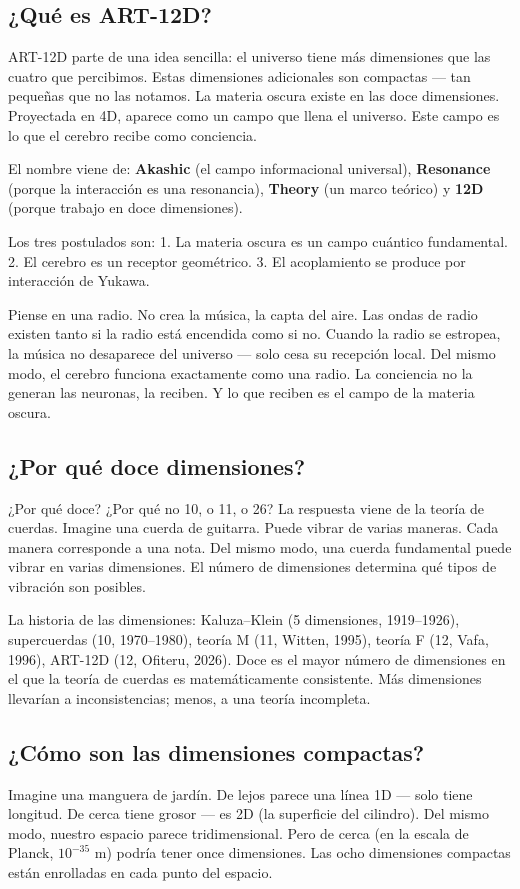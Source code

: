 \subsection{¿Qué es ART-12D?}
ART-12D parte de una idea sencilla: el universo tiene más dimensiones que las cuatro que percibimos. Estas dimensiones adicionales son compactas --- tan pequeñas que no las notamos. La materia oscura existe en las doce dimensiones. Proyectada en 4D, aparece como un campo que llena el universo. Este campo es lo que el cerebro recibe como conciencia.

El nombre viene de: \textbf{Akashic} (el campo informacional universal), \textbf{Resonance} (porque la interacción es una resonancia), \textbf{Theory} (un marco teórico) y \textbf{12D} (porque trabajo en doce dimensiones).

Los tres postulados son: 1. La materia oscura es un campo cuántico fundamental. 2. El cerebro es un receptor geométrico. 3. El acoplamiento se produce por interacción de Yukawa.

Piense en una radio. No crea la música, la capta del aire. Las ondas de radio existen tanto si la radio está encendida como si no. Cuando la radio se estropea, la música no desaparece del universo --- solo cesa su recepción local. Del mismo modo, el cerebro funciona exactamente como una radio. La conciencia no la generan las neuronas, la reciben. Y lo que reciben es el campo de la materia oscura.

\subsection{¿Por qué doce dimensiones?}
¿Por qué doce? ¿Por qué no 10, o 11, o 26? La respuesta viene de la teoría de cuerdas. Imagine una cuerda de guitarra. Puede vibrar de varias maneras. Cada manera corresponde a una nota. Del mismo modo, una cuerda fundamental puede vibrar en varias dimensiones. El número de dimensiones determina qué tipos de vibración son posibles.

La historia de las dimensiones: Kaluza--Klein (5 dimensiones, 1919--1926), supercuerdas (10, 1970--1980), teoría M (11, Witten, 1995), teoría F (12, Vafa, 1996), ART-12D (12, Ofiteru, 2026). Doce es el mayor número de dimensiones en el que la teoría de cuerdas es matemáticamente consistente. Más dimensiones llevarían a inconsistencias; menos, a una teoría incompleta.

\subsection{¿Cómo son las dimensiones compactas?}
Imagine una manguera de jardín. De lejos parece una línea 1D --- solo tiene longitud. De cerca tiene grosor --- es 2D (la superficie del cilindro). Del mismo modo, nuestro espacio parece tridimensional. Pero de cerca (en la escala de Planck, $10^{-35}$ m) podría tener once dimensiones. Las ocho dimensiones compactas están enrolladas en cada punto del espacio.

